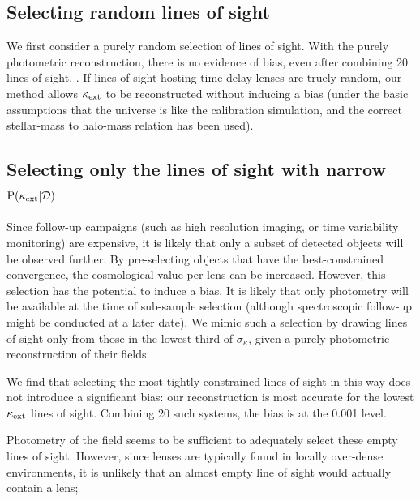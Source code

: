 \documentclass[useAMS,usenatbib,a4paper]{mn2e}
\begin{document}

\subsection{Selecting random lines of sight}
\label{sec:bias:random}

We first consider a purely random selection of lines of sight. With the purely
photometric reconstruction, there is no evidence of bias, even after combining
20 lines of sight. . If lines of sight hosting time delay lenses are truely random, 
our method allows $\kappa_{\rm ext}$ to be reconstructed without inducing a bias (under
the basic assumptions that the universe is like the calibration simulation,
and the correct stellar-mass to halo-mass relation has been used). 



\subsection{Selecting only the lines of sight with narrow ${\rm P}(\kappa_{\rm ext}|{\mathcal{D}})$}
\label{sec:bias:tightPDF}

Since follow-up campaigns (such as high resolution imaging, or time
variability monitoring) are expensive, it is likely that only a subset of
detected objects will be observed further. By pre-selecting objects that have 
the best-constrained convergence, the cosmological value per lens can be
increased. However, this selection 
has the potential to induce a bias. It is
likely that only photometry will be available at the time of sub-sample
selection (although spectroscopic follow-up might be conducted at a later
date). We mimic such a selection by drawing lines of sight only from those in
the lowest third of $\sigma_{\kappa}$, given a purely photometric
reconstruction of their fields. 

We find that selecting the most tightly constrained lines of sight in this way
does not introduce a significant bias:  our reconstruction is most accurate
for the lowest $\kappa_{\rm ext}$ lines of sight. Combining 20 such systems, the bias
is at the 0.001 level.

Photometry of the field seems to be sufficient to adequately select these
empty lines of sight.  However, 
since lenses are typically found in locally over-dense
environments, it is unlikely that  an almost empty line of sight would
actually  contain a lens; 
\end{document}

